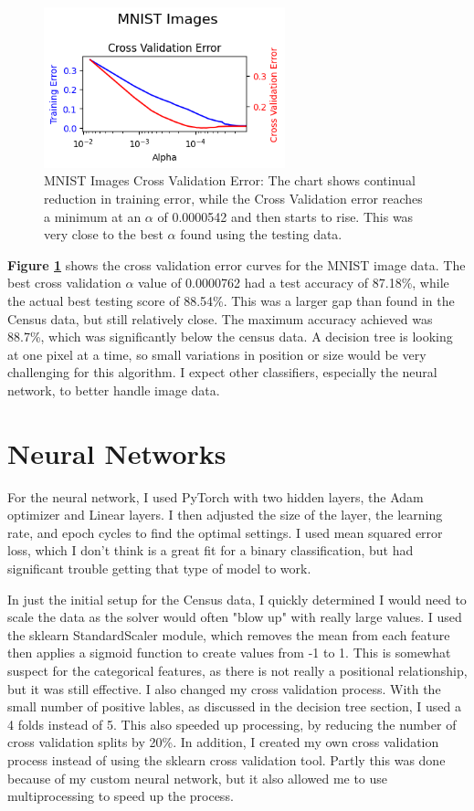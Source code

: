 \documentclass[letterpaper]{article} %
\begin{document}
\begin{figure}[h]
\centering
\includegraphics[width=2.75in]{figures/MNIST_Images_decision_tree_cross_validation.png}
\caption{MNIST Images Cross Validation Error:  The chart shows continual reduction in training error, while the Cross Validation error reaches a minimum at an $\alpha$ of 0.0000542 and then starts to rise.  This was very close to the best $\alpha$ found using the testing data. }
\label{fig:MNIST_Images_decision_tree_cross_validation}
\end{figure}

\textbf{Figure \ref{fig:MNIST_Images_decision_tree_cross_validation}}  shows the cross validation error curves for the MNIST image data.  The best cross validation $\alpha$ value of 0.0000762 had a test accuracy of 87.18\%,  while the actual best testing score of 88.54\%.  This was a larger gap than found in the Census data, but still relatively close. The maximum accuracy achieved was 88.7\%, which was significantly below the census data.  A decision tree is looking at one pixel at a time,  so small variations in position or size would be very challenging for this algorithm.  I expect other classifiers, especially the neural network, to better handle image data. 


\section{Neural Networks}
For the neural network, I used PyTorch with two hidden layers, the Adam optimizer and Linear layers.  I then adjusted the size of the layer, the learning rate, and epoch cycles to find the optimal settings.  I used mean squared error loss, which I don't think is a great fit for a binary classification, but had significant trouble getting that type of model to work.  

In just the initial setup for the Census data, I quickly determined I would need to scale the data as the solver would often "blow up" with really large values.  I used the sklearn StandardScaler module, which removes the mean from each feature then applies a sigmoid function to create values from -1 to 1.  This is somewhat suspect for the categorical features, as there is not really a positional relationship, but it was still effective.  I also changed my cross validation process.  With the small number of positive lables, as discussed in the decision tree section, I used a 4 folds instead of 5.  This also speeded up processing, by reducing the number of cross validation splits by 20\%.  In addition, I created my own cross validation process instead of using the sklearn cross validation tool.  Partly this was done because of my custom neural network, but it also allowed me to use multiprocessing to speed up the process.
\end{document}
